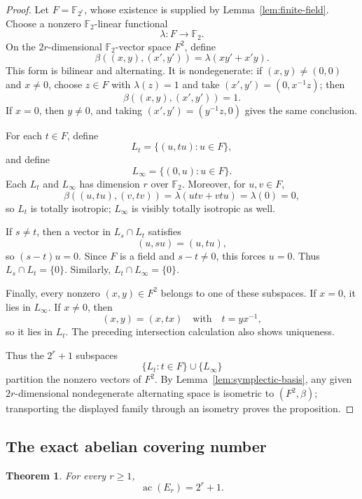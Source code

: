 \documentclass[11pt]{article}
\newtheorem{theorem}{Theorem}[section]
\theoremstyle{definition}
\newcommand{\F}{\mathbb{F}}
\newcommand{\ac}{\operatorname{ac}}
\begin{document}
\begin{proof}
Let $F=\F_{2^r}$, whose existence is supplied by Lemma~\ref{lem:finite-field}.  Choose a nonzero $\F_2$-linear functional
\[
 \lambda:F\longrightarrow\F_2.
\]
On the $2r$-dimensional $\F_2$-vector space $F^2$, define
\[
 \beta((x,y),(x',y'))=\lambda(xy'+x'y).
\]
This form is bilinear and alternating.  It is nondegenerate: if $(x,y)\ne(0,0)$ and $x\ne0$, choose $z\in F$ with $\lambda(z)=1$ and take $(x',y')=(0,x^{-1}z)$; then
\[
 \beta((x,y),(x',y'))=1.
\]
If $x=0$, then $y\ne0$, and taking $(x',y')=(y^{-1}z,0)$ gives the same conclusion.

For each $t\in F$, define
\[
 L_t=\{(u,tu):u\in F\},
\]
and define
\[
 L_\infty=\{(0,u):u\in F\}.
\]
Each $L_t$ and $L_\infty$ has dimension $r$ over $\F_2$.  Moreover, for $u,v\in F$,
\[
 \beta((u,tu),(v,tv))
 =\lambda(utv+vtu)=\lambda(0)=0,
\]
so $L_t$ is totally isotropic; $L_\infty$ is visibly totally isotropic as well.

If $s\ne t$, then a vector in $L_s\cap L_t$ satisfies
\[
 (u,su)=(u,tu),
\]
so $(s-t)u=0$.  Since $F$ is a field and $s-t\ne0$, this forces $u=0$.  Thus $L_s\cap L_t=\{0\}$.  Similarly, $L_t\cap L_\infty=\{0\}$.

Finally, every nonzero $(x,y)\in F^2$ belongs to one of these subspaces.  If $x=0$, it lies in $L_\infty$.  If $x\ne0$, then
\[
 (x,y)=(x,tx)
 \quad\text{with}\quad
 t=yx^{-1},
\]
so it lies in $L_t$.  The preceding intersection calculation also shows uniqueness.

Thus the $2^r+1$ subspaces
\[
 \{L_t:t\in F\}\cup\{L_\infty\}
\]
partition the nonzero vectors of $F^2$.  By Lemma~\ref{lem:symplectic-basis}, any given $2r$-dimensional nondegenerate alternating space is isometric to $(F^2,\beta)$; transporting the displayed family through an isometry proves the proposition.
\end{proof}

\subsection{The exact abelian covering number}

\begin{theorem}\label{thm:Er-cover}
For every $r\ge1$,
\[
 \ac(E_r)=2^r+1.
\]
\end{theorem}
\end{document}

